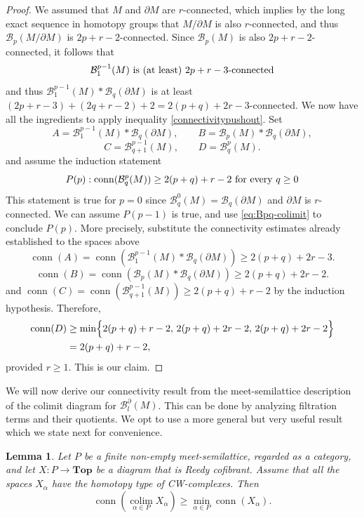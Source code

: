 \documentclass[11pt,a4paper]{article}
\numberwithin{equation}{section}
\newtheorem{lem}[thm]{Lemma}
\theoremstyle{definition}
\theoremstyle{remark}
\newcommand{\pa}{\partial}
\newcommand{\BB}{\mathcal B}
\newcommand{\conn}{\operatorname{conn}}
\begin{document}
\begin{proof}
We assumed that $M$ and $\partial M$ are $r$-connected, which implies by the long exact sequence in homotopy groups that $M/\pa M$ is also $r$-connected, and thus $\BB_p(M/\pa M)$ is $2p+r-2$-connected. Since $\BB_p(M)$ is also $2p+r-2$-connected, it follows that
$$\BB_1^{p-1}(M)\ \hbox{is (at least) $2p+r-3$-connected}$$
and thus
$\BB_1^{p-1}(M)*\BB_q(\pa M)$
is at least $(2p+r-3) + (2q+r-2)+2 = 2(p+q)+2r-3$-connected.
We now have all the ingredients to apply inequality \eqref{connectivitypushout}. Set
\[
A=\BB_1^{p-1}(M)*\BB_q(\partial M),\qquad
B=\BB_p(M)*\BB_q(\partial M),
\]
\[
C=\BB_{q+1}^{p-1}(M),\qquad
D=\BB_q^p(M).
\]
and assume the induction statement
$$P(p):\conn(\BB_q^p(M))\ge 2(p+q)+r-2\ \hbox{for every}\ q\geq 0$$ This statement is true for $p=0$ since $\BB_q^0(M)=\BB_q(\partial M)$ and $\partial M$ is $r$-connected.
We can assume $P(p-1)$ is true, and use \eqref{eq:Bpq-colimit} to conclude $P(p)$. More precisely,
substitute the connectivity estimates already established to the spaces above
\[
\conn(A)
=
\conn\!\left(\BB_1^{p-1}(M)*\BB_q(\partial M)\right)
\ge
2(p+q)+2r-3.
\]
\[
\conn(B)
=
\conn\!\left(\BB_p(M)*\BB_q(\partial M)\right)
\ge
2(p+q)+2r-2.
\]
and
$
\conn(C)
=
\conn\!\left(\BB_{q+1}^{p-1}(M)\right)
\ge
2(p+q)+r-2
$ by the induction hypothesis.
Therefore,
\[
\begin{aligned}
\conn(D)
&\ge
\min\Bigl\{
2(p+q)+r-2,\,
2(p+q)+2r-2,\,
2(p+q)+2r-2
\Bigr\}\\
&=
2(p+q)+r-2,
\end{aligned}
\]
provided \(r\ge 1\). This is our claim.
\end{proof}

We will now derive our connectivity result from the meet-semilattice description of the colimit diagram for $\BB_l^\pa(M)$. This can be done by analyzing filtration terms and their quotients. We opt to use a more general but very useful result which we state next for convenience.

\begin{lem}\label{colimitconnectivity}
Let \(P\) be a finite non-empty meet-semilattice, regarded as a category, and let
$
X\colon P\longrightarrow \mathbf{Top}
$
be a diagram that is Reedy cofibrant. Assume that all the
spaces \(X_\alpha\) have the homotopy type of CW-complexes. Then
\[
\conn\left(\operatorname*{colim}_{\alpha\in P}X_\alpha\right)
\geq
\min_{\alpha\in P}\conn(X_\alpha).
\]
\end{lem}
\end{document}
